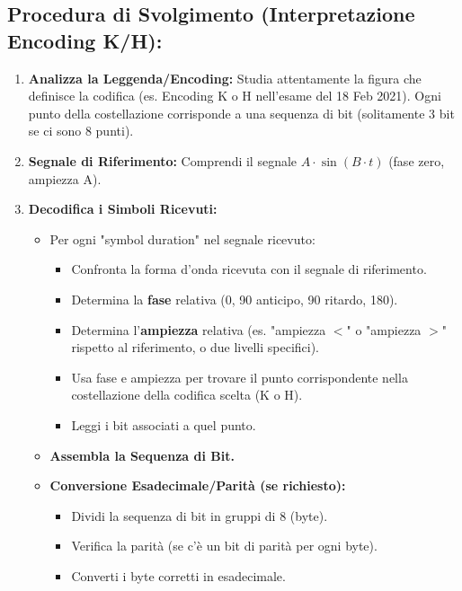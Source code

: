 \subsection{Procedura di Svolgimento (Interpretazione Encoding K/H):}
\begin{enumerate}
    \item \textbf{Analizza la Leggenda/Encoding:} Studia attentamente la figura che definisce la codifica (es. Encoding K o H nell'esame del 18 Feb 2021). Ogni punto della costellazione corrisponde a una sequenza di bit (solitamente 3 bit se ci sono 8 punti).
    \item \textbf{Segnale di Riferimento:} Comprendi il segnale $A \cdot \sin(B \cdot t)$ (fase zero, ampiezza A).
    \item \textbf{Decodifica i Simboli Ricevuti:}
    \begin{itemize}
        \item Per ogni "symbol duration" nel segnale ricevuto:
        \begin{itemize}
            \item Confronta la forma d'onda ricevuta con il segnale di riferimento.
            \item Determina la \textbf{fase} relativa (0\textdegree, 90\textdegree{} anticipo, 90\textdegree{} ritardo, 180\textdegree).
            \item Determina l'\textbf{ampiezza} relativa (es. "ampiezza $<$" o "ampiezza $>$" rispetto al riferimento, o due livelli specifici).
            \item Usa fase e ampiezza per trovare il punto corrispondente nella costellazione della codifica scelta (K o H).
            \item Leggi i bit associati a quel punto.
        \end{itemize}
    \item \textbf{Assembla la Sequenza di Bit.}
    \item \textbf{Conversione Esadecimale/Parità (se richiesto):}
    \begin{itemize}
        \item Dividi la sequenza di bit in gruppi di 8 (byte).
        \item Verifica la parità (se c'è un bit di parità per ogni byte).
        \item Converti i byte corretti in esadecimale.
    \end{itemize}
    \end{itemize}
\end{enumerate}

